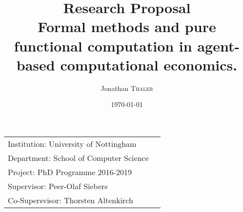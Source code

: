 \documentclass{article}
\title{Research Proposal \\ Formal methods and pure functional computation in agent-based computational economics.} %
\author{Jonathan \textsc{Thaler}} %
\date{\today} %
\begin{document}
\maketitle %

\begin{center}
\begin{tabular}{l r}
Institution: University of Nottingham \\
Department: School of Computer Science \\
Project: PhD Programme 2016-2019 \\
Supervisor: Peer-Olaf Siebers \\
Co-Supersvisor: Thorsten Altenkirch 
\end{tabular}
\end{center}

\end{document}
